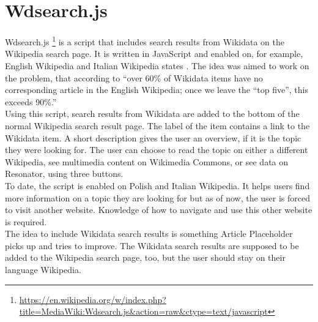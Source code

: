 \section{Wdsearch.js}
Wdsearch.js \footnote{\url{https://en.wikipedia.org/w/index.php?title=MediaWiki:Wdsearch.js&action=raw&ctype=text/javascript}} is a script that includes search results from Wikidata on the Wikipedia search page. It is written in JavaScript and enabled on, for example, English Wikipedia and Italian Wikipedia states \citet{gerardm:01, gerardm:02}.
The idea was aimed to work on the problem, that according to \citet{manske:01} ``over 60\% of Wikidata items have no corresponding article in the English Wikipedia; once we leave the “top five”, this exceeds 90\%.'' \\
Using this script, search results from Wikidata are added to the bottom of the normal Wikipedia search result page. The label of the item contains a link to the Wikidata item. A short description gives the user an overview, if it is the topic they were looking for. The user can choose to read the topic on either a different Wikipedia, see multimedia content on Wikimedia Commons, or see data on Resonator, using three buttons. \\
To date, the script is enabled on Polish and Italian Wikipedia. It helps users find more information on a topic they are looking for but as of now, the user is forced to visit another website. Knowledge of how to navigate and use this other website is required. \\
The idea to include Wikidata search results is something Article Placeholder picks up and tries to improve. The Wikidata search results are supposed to be added to the Wikipedia search page, too, but the user should stay on their language Wikipedia.